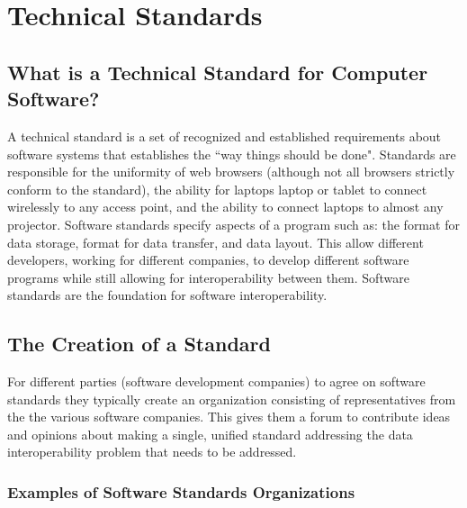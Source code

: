 \documentclass[14pt]{article}
\begin{document}
\newpage

\section{Technical Standards}
\label{sec:TechnicalStandards}

\subsection{What is a Technical Standard for Computer Software?}
A technical standard is a set of recognized and established requirements about software systems that establishes the ``way things should be done". Standards are responsible for the uniformity of web browsers (although not all browsers strictly conform to the standard), the ability for laptops laptop or tablet to connect wirelessly to any access point, and the ability to connect laptops to almost any projector. Software standards specify aspects of a program such as: the format for data storage, format for data transfer, and data layout. This allow different developers, working for different companies, to develop different software programs while still allowing for \gls{interoperability} between them. Software standards are the foundation for software \gls{interoperability}.

\subsection{The Creation of a Standard}
For different parties (software development companies) to agree on software standards they typically create an organization consisting of representatives from the the various software companies. This gives them a forum to contribute ideas and opinions about making a single, unified standard addressing the data \gls{interoperability} problem that needs to be addressed.

\subsubsection{Examples of Software Standards Organizations}


\end{document}
